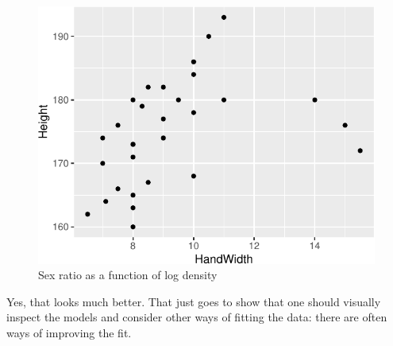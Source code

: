 \documentclass[
  a4paperpaper,
]{book}
\newenvironment{Shaded}{\begin{snugshade}}{\end{snugshade}}
\newcommand{\DataTypeTok}[1]{\textcolor[rgb]{0.13,0.29,0.53}{#1}}
\newcommand{\DecValTok}[1]{\textcolor[rgb]{0.00,0.00,0.81}{#1}}
\newcommand{\KeywordTok}[1]{\textcolor[rgb]{0.13,0.29,0.53}{\textbf{#1}}}
\newcommand{\NormalTok}[1]{#1}
\newcommand{\OperatorTok}[1]{\textcolor[rgb]{0.81,0.36,0.00}{\textbf{#1}}}
\newcommand{\StringTok}[1]{\textcolor[rgb]{0.31,0.60,0.02}{#1}}
\begin{document}
\begin{Shaded}
\end{Shaded}

\begin{figure}
\centering
\includegraphics{BB852_files/figure-latex/unnamed-chunk-257-1.pdf}
\caption{\label{fig:unnamed-chunk-257}Sex ratio as a function of log density}
\end{figure}

Yes, that looks much better. That just goes to show that one should visually inspect the models and consider other ways of fitting the data: there are often ways of improving the fit.
\end{document}
